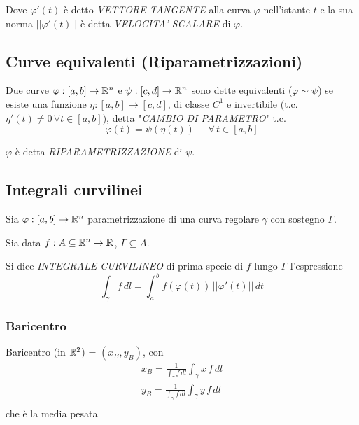 Dove $\varphi' (t)$ è detto \emph{VETTORE TANGENTE} alla curva $\varphi$ nell'istante $t$ e la sua norma $||\varphi' (t)||$ è detta \emph{VELOCITA' SCALARE} di $\varphi$.

\subsection{Curve equivalenti (Riparametrizzazioni)}
\begin{definition}
    Due curve $\varphi:[a,b] \to \mathbb{R}^n$ e $\psi :[c,d] \to \mathbb{R}^n$ sono dette equivalenti ($\varphi \sim \psi$) se esiste una funzione $\eta : [a,b] \to [c,d]$, di classe $C^1$ e invertibile (t.c. $\eta'(t) \neq 0 \, \forall t \in [a,b]$), detta "\emph{CAMBIO DI PARAMETRO}" t.c.
    \begin{equation}
        \varphi(t) = \psi (\eta(t)) \mspace{25mu} \forall \, t \in [a,b]
    \end{equation}
\end{definition}

\begin{definition}
    $\varphi$ è detta \emph{RIPARAMETRIZZAZIONE} di $\psi$.
\end{definition}

\subsection{Integrali curvilinei}
\begin{definition}
    Sia $\varphi:[a,b] \to \mathbb{R}^n$ parametrizzazione di una curva regolare $\gamma$ con sostegno $\Gamma$.
    
    Sia data $f:A \subseteq \mathbb{R}^n \to \mathbb{R}$, $\Gamma \subseteq A$.

    Si dice \emph{INTEGRALE CURVILINEO} di prima specie di $f$ lungo $\Gamma$ l'espressione
    \begin{equation}
        \int_\gamma f \, dl = \int_a^b f(\varphi(t)) \, ||\varphi'(t)|| \, dt
    \end{equation}
\end{definition}

\subsubsection{Baricentro}
Baricentro (in $\mathbb{R}^2$) = $(x_B, y_B)$, con
\begin{equation}
    \begin{array}{l}
        x_B = \frac{1}{\int_\gamma f \, dl} \int_\gamma x \, f\, dl \\
        y_B = \frac{1}{\int_\gamma f \, dl} \int_\gamma y \, f\, dl \\
    \end{array}
\end{equation}
che è la media pesata